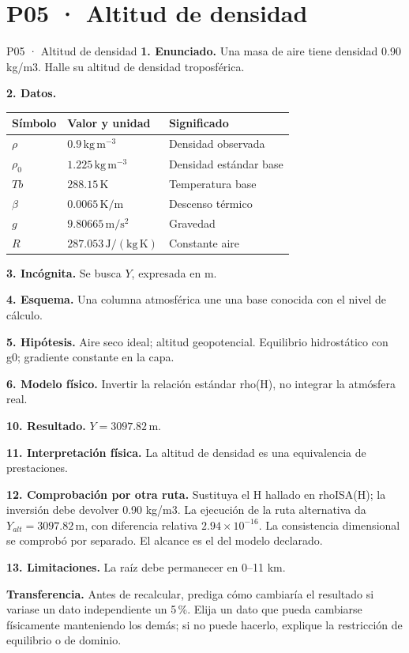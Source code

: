 \chapter*{P05 · Altitud de densidad}
\begin{studiumworked}{P05 · Altitud de densidad}
\textbf{1. Enunciado.} Una masa de aire tiene densidad 0.90 kg/m3. Halle su altitud de densidad troposférica.

\textbf{2. Datos.}
\begin{longtable}{p{.16\linewidth}p{.35\linewidth}p{.38\linewidth}}\toprule Símbolo & Valor y unidad & Significado\\\midrule\endhead
$\rho$ & $0.9\,\mathrm{kg\,m^{-3}}$ & Densidad observada\\
$\rho_{0}$ & $1.225\,\mathrm{kg\,m^{-3}}$ & Densidad estándar base\\
$Tb$ & $288.15\,\mathrm K$ & Temperatura base\\
$\beta$ & $0.0065\,\mathrm{K/m}$ & Descenso térmico\\
$g$ & $9.80665\,\mathrm{m/s^2}$ & Gravedad\\
$R$ & $287.053\,\mathrm{J/(kg\,K)}$ & Constante aire\\
\bottomrule\end{longtable}
\textbf{3. Incógnita.} Se busca $Y$, expresada en $\mathrm m$.

\textbf{4. Esquema.} Una columna atmosférica une una base conocida con el nivel de cálculo.

\textbf{5. Hipótesis.} Aire seco ideal; altitud geopotencial. Equilibrio hidrostático con g0; gradiente constante en la capa.

\textbf{6. Modelo físico.} Invertir la relación estándar rho(H), no integrar la atmósfera real.


\textbf{10. Resultado.} $Y=3097.82\,\mathrm m$.

\textbf{11. Interpretación física.} La altitud de densidad es una equivalencia de prestaciones.

\textbf{12. Comprobación por otra ruta.} Sustituya el H hallado en rhoISA(H); la inversión debe devolver 0.90 kg/m3. La ejecución de la ruta alternativa da $Y_{alt}=3097.82\,\mathrm m$, con diferencia relativa $2.94\times10^{-16}$. La consistencia dimensional se comprobó por separado. El alcance es el del modelo declarado.

\textbf{13. Limitaciones.} La raíz debe permanecer en 0–11 km.

\textbf{Transferencia.} Antes de recalcular, prediga cómo cambiaría el resultado si variase un dato independiente un 5\,\%. Elija un dato que pueda cambiarse físicamente manteniendo los demás; si no puede hacerlo, explique la restricción de equilibrio o de dominio.\par
\end{studiumworked}
